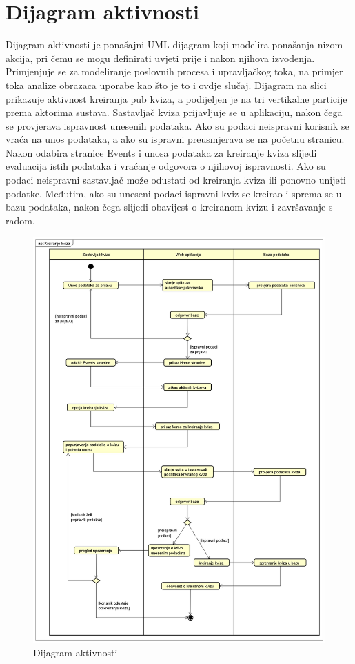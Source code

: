 		
		\eject 
		
		\section{Dijagram aktivnosti}
		
		
		Dijagram aktivnosti je ponašajni UML dijagram koji modelira ponašanja nizom akcija, pri čemu se mogu definirati uvjeti prije i nakon njihova izvođenja. Primjenjuje se za modeliranje poslovnih procesa i upravljačkog toka, na primjer toka analize obrazaca uporabe kao što je to i ovdje slučaj. Dijagram na slici prikazuje aktivnost kreiranja pub kviza, a podijeljen je na tri vertikalne particije prema aktorima sustava. Sastavljač kviza prijavljuje se u aplikaciju, nakon čega se provjerava ispravnost unesenih podataka. Ako su podaci neispravni korisnik se vraća na unos podataka, a ako su ispravni preusmjerava se na početnu stranicu. Nakon odabira stranice Events i unosa podataka za kreiranje kviza slijedi evaluacija istih podataka i vraćanje odgovora o njihovoj ispravnosti. Ako su podaci neispravni sastavljač može odustati od kreiranja kviza ili ponovno unijeti podatke. Međutim, ako su uneseni podaci ispravni kviz se kreirao i sprema se u bazu podataka, nakon čega slijedi obavijest o kreiranom kvizu i završavanje s radom.   
		
		\begin{figure}[H]
			\includegraphics[width=\textwidth]{dijagrami/ActivityDiagram.PNG} 
			\caption{Dijagram aktivnosti}
			\label{fig:ActivityDiagram}
		\end{figure}
		
